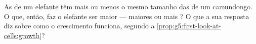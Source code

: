 \begin{exercise}[$\star\star\star$]\label{exo:g5:first-look-at-cells:11}
As  de um elefante têm mais ou menos o mesmo tamanho das de um
camundongo. O que, então, faz o elefante ser maior --- 
maiores ou mais ? O que a sua resposta diz sobre como o
crescimento funciona, segundo a
\cref{prop:g5:first-look-at-cells:growth}?
\end{exercise}
